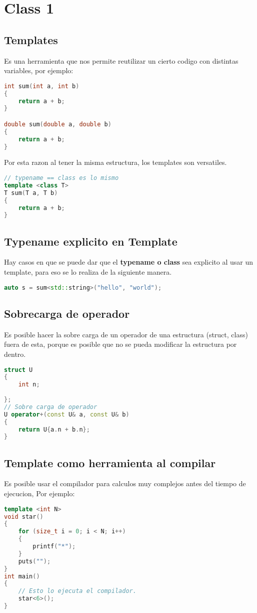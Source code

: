 \section{Class 1}
\subsection{Templates}
Es una herramienta que nos permite reutilizar un cierto codigo con distintas variables, por ejemplo:
\begin{lstlisting}[language=C++, caption={Templates 1}]
int sum(int a, int b)
{
    return a + b;
}

double sum(double a, double b)
{
    return a + b;
}
\end{lstlisting}
Por esta razon al tener la misma estructura, los templates son versatiles.
\begin{lstlisting}[language=C++, caption={Templates 2}]
// typename == class es lo mismo
template <class T>
T sum(T a, T b)
{
    return a + b;
}
\end{lstlisting}

\subsection{Typename explicito en Template}
Hay casos en que se puede dar que el \textbf{typename o class} sea explicito 
al usar un template, para eso se lo realiza de la siguiente manera.
\begin{lstlisting}[language=C++, caption={'T explicito'}]
auto s = sum<std::string>("hello", "world");
\end{lstlisting}


\subsection{Sobrecarga de operador}
Es posible hacer la sobre carga de un operador de una estructura (struct, class) fuera de esta,
porque es posible que no se pueda modificar la estructura por dentro.

\begin{lstlisting}[language=C++, caption={'Overload'}]
struct U
{
    int n;
    
};
// Sobre carga de operador
U operator+(const U& a, const U& b)
{
    return U{a.n + b.n};
}
\end{lstlisting}

\subsection{Template como herramienta al compilar}
Es posible usar el compilador para calculos muy complejos antes del tiempo de ejecucion,
Por ejemplo:
\begin{lstlisting}[language=C++, caption={'Calculos complejos'}]
template <int N>
void star()
{
    for (size_t i = 0; i < N; i++)
    {
        printf("*");
    }
    puts("");
}
int main()
{
    // Esto lo ejecuta el compilador.
    star<6>();
}
\end{lstlisting}


